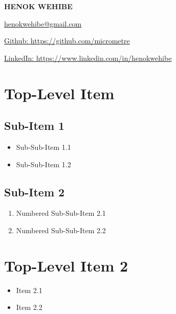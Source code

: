\documentclass{article}
\begin{document}
\begin{center}
\textbf{\Huge HENOK WEHIBE} 

\vspace{1.5em}

\href{mailto:henokwehibe@gmail.com}{henokwehibe@gmail.com} 

\vspace{0.5em}

\href{https://github.com/micrometre}{Github: https://github.com/micrometre }

\vspace{0.5em}

\href{https://www.linkedin.com/in/henokwehibe}{LinkedIn: https://www.linkedin.com/in/henokwehibe}

\end{center}

\vspace{0.1em}


\section{Top-Level Item}

\subsection{Sub-Item 1}
\begin{itemize}
    \item Sub-Sub-Item 1.1
    \item Sub-Sub-Item 1.2
\end{itemize}

\subsection{Sub-Item 2}
\begin{enumerate}
    \item Numbered Sub-Sub-Item 2.1
    \item Numbered Sub-Sub-Item 2.2
\end{enumerate}

\section{Top-Level Item 2}
\begin{itemize}
    \item Item 2.1
    \item Item 2.2
\end{itemize}
\end{document}
